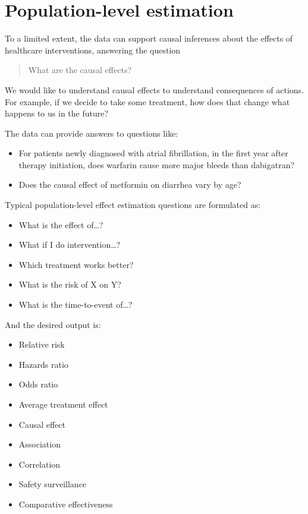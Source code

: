 \documentclass[11pt]{book}
\providecommand{\tightlist}{%
  \setlength{\itemsep}{0pt}\setlength{\parskip}{0pt}}
\theoremstyle{definition}
\theoremstyle{definition}
\theoremstyle{definition}
\theoremstyle{remark}
\begin{document}
\hypertarget{population-level-estimation}{%
\section{Population-level estimation}\label{population-level-estimation}}

To a limited extent, the data can support causal inferences about the effects of healthcare interventions, answering the question

\begin{quote}
What are the causal effects?
\end{quote}

We would like to understand causal effects to understand consequences of actions. For example, if we decide to take some treatment, how does that change what happens to us in the future?

The data can provide answers to questions like:

\begin{itemize}
\tightlist
\item
  For patients newly diagnosed with atrial fibrillation, in the first year after therapy initiation, does warfarin cause more major bleeds than dabigatran?
\item
  Does the causal effect of metformin on diarrhea vary by age?
\end{itemize}

Typical population-level effect estimation questions are formulated as:

\begin{itemize}
\tightlist
\item
  What is the effect of\ldots?
\item
  What if I do intervention\ldots?
\item
  Which treatment works better?
\item
  What is the risk of X on Y?
\item
  What is the time-to-event of\ldots?
\end{itemize}

And the desired output is:

\begin{itemize}
\tightlist
\item
  Relative risk
\item
  Hazards ratio
\item
  Odds ratio
\item
  Average treatment effect
\item
  Causal effect
\item
  Association
\item
  Correlation
\item
  Safety surveillance
\item
  Comparative effectiveness
\end{itemize}
\end{document}
